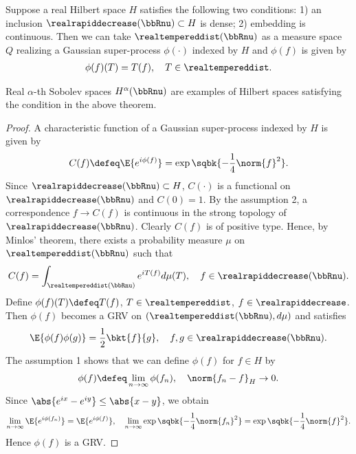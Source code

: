 \documentclass[openany, a4paper, oneside]{jsbook}
\begin{document}
\begin{thm}
 Suppose a real Hilbert space $H$ satisfies the following two conditions:
 1) an inclusion $\realrapiddecrease (\bbRnu) \subset H$ is dense;
 2) embedding is continuous.
 Then we can take $\realtempereddist (\bbRnu)$ as a measure space $Q$ realizing a Gaussian super-process $\phi (\cdot)$ indexed by $H$
 and $\phi (f)$ is given by
 \begin{align}
  \phi (f) (T) = T (f), \quad T \in \realtempereddist.
 \end{align}
\end{thm}
\begin{rem}
 Real $\alpha$-th Sobolev spaces $H^{\alpha}(\bbRnu)$ are examples of Hilbert spaces satisfying the condition in the above theorem.
\end{rem}
\begin{proof}
 A characteristic function of a Gaussian super-process indexed by $H$ is given by
 \begin{align}
  C (f) \defeq \E{e^{i \phi (f)}} = \exp \sqbk{- \frac{1}{4} \norm{f}^2}.
 \end{align}
 Since $\realrapiddecrease (\bbRnu) \subset H$, $C (\cdot)$ is a functional on $\realrapiddecrease (\bbRnu)$ and $C (0)=1$.
 By the assumption 2, a correspondence $f \to C (f)$ is continuous in the strong topology of $\realrapiddecrease (\bbRnu)$.
 Clearly $C (f)$ is of positive type.
 Hence, by Minlos' theorem, there exists a probability measure $\mu$ on $\realtempereddist (\bbRnu)$ such that
 \begin{align}
  C (f) = \int_{\realtempereddist (\bbRnu)} e^{i T (f)} d \mu (T), \quad f \in \realrapiddecrease (\bbRnu).
 \end{align}
 Define $\phi (f) (T) \defeq T (f)$, $T \in \realtempereddist$, $f \in \realrapiddecrease$.
 Then $\phi (f)$ becomes a GRV on $(\realtempereddist (\bbRnu), d \mu)$ and satisfies
 \begin{align}
  \E{\phi (f) \phi (g)} = \frac{1}{2} \bkt{f}{g}, \quad f, g \in \realrapiddecrease (\bbRnu).
 \end{align}
 The assumption 1 shows that we can define $\phi (f)$ for $f \in H$ by
 \begin{align}
  \phi (f) \defeq \lim_{n \to \infty} \phi (f_n), \quad \norm{f_n - f}_{H} \to 0.
 \end{align}
 Since $\abs{e^{ix} - e^{iy}} \leq \abs{x - y}$, we obtain
 \begin{align}
  \lim_{n \to \infty} \E{e^{i \phi (f_n)}}
  =
  \E{e^{i \phi (f)}}, \quad
  \lim_{n \to \infty} \exp \sqbk{- \frac{1}{4} \norm{f_n}^2}
  =
  \exp \sqbk{- \frac{1}{4} \norm{f}^2}.
 \end{align}
 Hence $\phi (f)$ is a GRV.
\end{proof}
\end{document}
